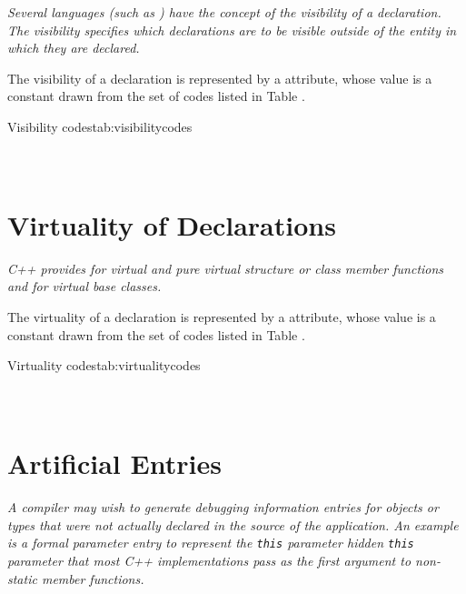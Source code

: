 \textit{Several languages (such as ) 
have the concept of the visibility of a declaration. The
visibility specifies which declarations are to be 
visible outside of the entity in which they are
declared.}

The 
\hypertarget{chap:DWATvisibilityvisibilityofdeclaration}{}
visibility of a declaration is represented 
by a \DWATvisibility{}
attribute, whose value is a
constant drawn from the set of codes listed in 
Table .

\begin{simplenametable}[1.5in]{Visibility codes}{tab:visibilitycodes}
\DWVISlocalTARG{}          \\
\DWVISexportedTARG{}    \\
\DWVISqualifiedTARG{}  \\
\end{simplenametable}

\section{Virtuality of Declarations}
\label{chap:virtualityofdeclarations}
\textit{C++ provides for virtual and pure virtual structure or class
member functions and for virtual base classes.}

The 
\hypertarget{chap:DWATvirtualityvirtualityindication}{}
virtuality of a declaration is represented by a
\DWATvirtuality{}
attribute, whose value is a constant drawn
from the set of codes listed in 
Table .

\begin{simplenametable}[2.5in]{Virtuality codes}{tab:virtualitycodes}
\DWVIRTUALITYnoneTARG{}                      \\
\DWVIRTUALITYvirtualTARG{}                \\
\DWVIRTUALITYpurevirtualTARG{}    \\
\end{simplenametable}

\section{Artificial Entries}
\label{chap:artificialentries}
\textit{A compiler may wish to generate debugging information entries
for objects or types that were not actually declared in the
source of the application. An example is a formal parameter
entry to represent the 
\texttt{this} parameter
hidden \texttt{this} parameter that most C++
implementations pass as the first argument to non-static member
functions.}  

